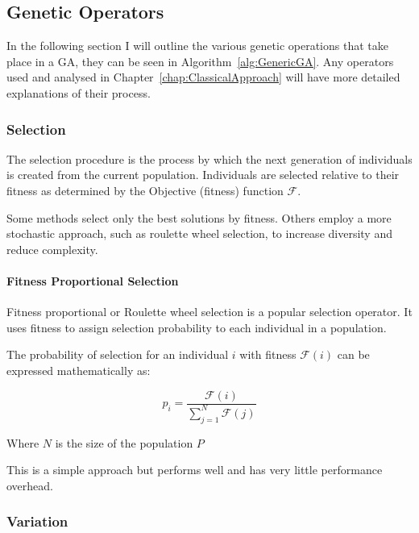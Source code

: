\subsection{Genetic Operators}

In the following section I will outline the various genetic operations that take place in a GA, they can be seen in Algorithm~\ref{alg:GenericGA}. Any operators used and analysed in Chapter~\ref{chap:ClassicalApproach} will have more detailed explanations of their process.

\subsubsection{Selection}

The selection procedure is the process by which the next generation of individuals is created from the current population. Individuals are selected relative to their fitness as determined by the Objective (fitness) function $\mathcal{F}$. 

Some methods select only the best solutions by fitness. Others employ a more stochastic approach, such as roulette wheel selection, to increase diversity and reduce complexity.

\paragraph{Fitness Proportional Selection}

Fitness proportional or Roulette wheel selection is a popular selection operator. It uses fitness to assign selection probability to each individual in a population.

The probability of selection for an individual $i$ with fitness $\mathcal{F}(i)$ can be expressed mathematically as:

\begin{equation}
    p_i = \frac{\mathcal{F}(i)}{ \sum^{N}_{j=1} \mathcal{F}(j)} 
\end{equation}

Where $N$ is the size of the population $P$

This is a simple approach but performs well and has very little performance overhead.  

\subsubsection{Variation}

